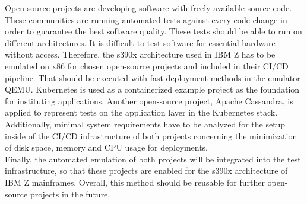 Open-source projects are developing software with freely available source code. These communities are running automated tests against every code change in order to guarantee the best software quality. 
These tests should be able to run on different architectures. It is difficult to test software for essential hardware without access. Therefore, the \gls{s390x} architecture used in IBM Z has to be emulated on x86 for chosen open-source projects and included in their \gls{CI/CD} pipeline. 
That should be executed with fast deployment methods in the \gls{emulator} QEMU. 
Kubernetes is used as a \gls{containerized} example project as the foundation for instituting applications. Another open-source project, Apache Cassandra, is applied to represent tests on the \gls{application layer} in the Kubernetes stack. \\
Additionally, minimal system requirements have to be analyzed for the setup inside of the CI/CD infrastructure of both projects concerning the minimization of disk space, memory and CPU usage for deployments. \\
Finally, the automated emulation of both projects will be integrated into the test infrastructure, so that these projects are enabled for the s390x architecture of \gls{IBM Z mainframes}. Overall, this method should be reusable for further open-source projects in the future.


